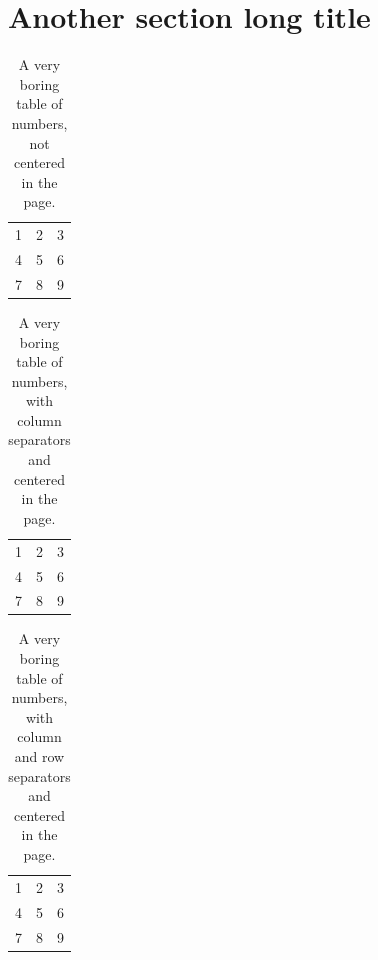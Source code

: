 \documentclass{article}
\begin{document}
\clearpage %


\section[Another section short title]{Another section long title}

\begin{table}[t] %
\begin{tabular}{ l c r }
  1 & 2 & 3 \\
  4 & 5 & 6 \\
  7 & 8 & 9 \\
\end{tabular}
\caption{A very boring table of numbers, not centered in the page.}
\end{table}

\begin{table}[t] %
\centering %
\begin{tabular}{ l | c | r }
  1 & 2 & 3 \\
  4 & 5 & 6 \\
  7 & 8 & 9 \\
\end{tabular}
\caption{A very boring table of numbers, with column separators and centered in the page.}
\end{table}

\begin{table}[ht] %
\centering %
\begin{tabular}{ |l | c | r| }
  \hline			
  1 & 2 & 3 \\
  4 & 5 & 6 \\
  7 & 8 & 9 \\
  \hline  
\end{tabular}
\caption{A very boring table of numbers, with column and row separators and centered in the page.}
\end{table}
\end{document}
